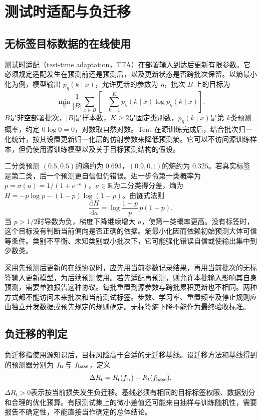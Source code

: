 \section{测试时适配与负迁移}

\subsection{无标签目标数据的在线使用}
测试时适配（test-time adaptation，TTA）在部署输入到达后更新有限参数。它必须规定适配发生在预测前还是预测后，以及更新状态是否跨批次保留。以熵最小化为例，模型输出 $p_\eta(k\mid x)$，允许更新的参数为 $\eta$，批次 $B$ 上的目标为
\begin{equation}
\min_\eta\frac1{|B|}\sum_{x\in B}
\left[-\sum_{k=1}^{K}p_\eta(k\mid x)\log p_\eta(k\mid x)\right].
\label{eq:transfer-tta-entropy}
\end{equation}
$B$是非空部署批次，$|B|$是样本数，$K\geq2$是固定类别数，$p_\eta(k\mid x)$是第 $k$类预测概率，约定 $0\log0=0$，对数取自然对数。Tent 在源训练完成后，结合批次归一化统计，按其设置更新归一化层的仿射参数来降低预测熵\cite{wang2021tent}。它可以不访问源训练样本，但仍使用源训练模型以及关于目标预测结构的假设。

二分类预测 $(0.5,0.5)$的熵约为 $0.693$，$(0.9,0.1)$的熵约为 $0.325$。若真实标签是第二类，后一个预测更自信但仍错误。进一步令第一类概率为 $p=\sigma(a)=1/(1+e^{-a})$，$a\in\mathbb{R}$为二分类得分差，熵为 $H=-p\log p-(1-p)\log(1-p)$。由链式法则
\begin{equation}
 \frac{\mathrm dH}{\mathrm da}
 =\log\frac{1-p}{p}\,p(1-p).
\end{equation}
当 $p>1/2$时导数为负，梯度下降继续增大 $a$，使第一类概率更高。没有标签时，这个目标没有判断当前偏向是否正确的依据。熵最小化因而依赖初始预测大体可信等条件。类别不平衡、未知类别或小批次下，它可能强化错误自信或使输出集中到少数类。

采用先预测后更新的在线协议时，应先用当前参数记录结果，再用当前批次的无标签输入更新模型，为后续预测使用。若先适配再预测，则允许本批输入影响其自身预测，需要单独报告这种协议。每批重置到源参数与跨批累积更新也不相同。两种方式都不能访问未来批次和当前测试标签。步数、学习率、重置频率及停止规则应由独立开发数据或预先规定的规则确定。无标签熵下降不能作为最终验收标准。

\subsection{负迁移的判定}
负迁移指使用源知识后，目标风险高于合适的无迁移基线。设迁移方法和基线得到的预测器分别为 $f_{\rm tr}$与 $f_{\rm base}$，定义
\begin{equation}
 \Delta R_t=R_t(f_{\rm tr})-R_t(f_{\rm base}).
\end{equation}
$\Delta R_t>0$表示按当前损失发生负迁移。基线必须有相同的目标标签权限、数据划分和合理的优化预算。有限测试集上的微小差值还可能来自抽样与训练随机性，需要报告不确定性，不能直接当作确定的总体结论。


